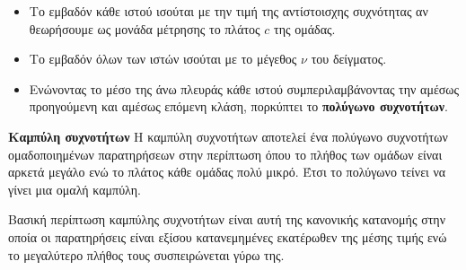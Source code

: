 \documentclass[twoside,nofonts,internet,math,spyros]{frontisthrio}
\begin{document}
\begin{arithmisi}
\begin{enumerate}[label=\bf\arabic*.,leftmargin=4mm]
\begin{itemize}
\item Το εμβαδόν κάθε ιστού ισούται με την τιμή της αντίστοισχης συχνότητας αν θεωρήσουμε ως μονάδα μέτρησης το πλάτος $ c $ της ομάδας.
\item Το εμβαδόν όλων των ιστών ισούται με το μέγεθος $ \nu $ του δείγματος.
\item Ενώνοντας το μέσο της άνω πλευράς κάθε ιστού συμπεριλαμβάνοντας την αμέσως προηγούμενη και αμέσως επόμενη κλάση, πορκύπτει το \textbf{πολύγωνο συχνοτήτων}.
\end{itemize}
\end{enumerate}
\item\textbf{Καμπύλη συχνοτήτων}
Η καμπύλη συχνοτήτων αποτελεί ένα πολύγωνο συχνοτήτων ομαδοποιημένων παρατηρήσεων στην περίπτωση όπου το πλήθος των ομάδων είναι αρκετά μεγάλο ενώ το πλάτος κάθε ομάδας πολύ μικρό. Έτσι το πολύγωνο τείνει να γίνει μια ομαλή καμπύλη. 
\begin{center}
\end{center}
Βασική περίπτωση καμπύλης συχνοτήτων είναι αυτή της κανονικής κατανομής στην οποία οι παρατηρήσεις είναι εξίσου κατανεμημένες εκατέρωθεν της μέσης τιμής ενώ το μεγαλύτερο πλήθος τους συσπειρώνεται γύρω της.
\end{arithmisi}
\thewrhmata
\end{document}
